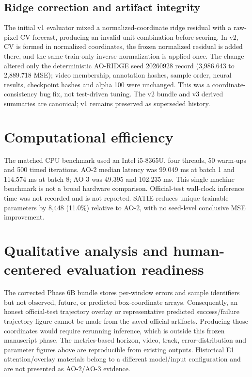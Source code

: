 \documentclass[11pt]{article}
\begin{document}
\subsection{Ridge correction and artifact integrity}
The initial v1 evaluator mixed a normalized-coordinate ridge residual with a raw-pixel CV forecast, producing an invalid unit combination before scoring. In v2, CV is formed in normalized coordinates, the frozen normalized residual is added there, and the same train-only inverse normalization is applied once. The change altered only the deterministic AO-RIDGE seed 20260928 record (3,986.643 to 2,889.718 MSE); video membership, annotation hashes, sample order, neural results, checkpoint hashes and alpha 100 were unchanged. This was a coordinate-consistency bug fix, not test-driven tuning. The v2 bundle and v3 derived summaries are canonical; v1 remains preserved as superseded history.

\section{Computational efficiency}
The matched CPU benchmark used an Intel i5-8365U, four threads, 50 warm-ups and 500 timed iterations. AO-2 median latency was 99.049 ms at batch 1 and 114.574 ms at batch 8; AO-3 was 49.395 and 102.235 ms. This single-machine benchmark is not a broad hardware comparison. Official-test wall-clock inference time was not recorded and is not reported. SATIE reduces unique trainable parameters by 8,448 (11.0\%) relative to AO-2, with no seed-level conclusive MSE improvement.

\section{Qualitative analysis and human-centered evaluation readiness}
The corrected Phase 6B bundle stores per-window errors and sample identifiers but not observed, future, or predicted box-coordinate arrays. Consequently, an honest official-test trajectory overlay or representative predicted success/failure trajectory figure cannot be made from the saved official artifacts. Producing those coordinates would require rerunning inference, which is outside this frozen manuscript phase. The metrics-based horizon, video, track, error-distribution and parameter figures above are reproducible from existing outputs. Historical E1 attention/overlay materials belong to a different model/input configuration and are not presented as AO-2/AO-3 evidence.
\end{document}

